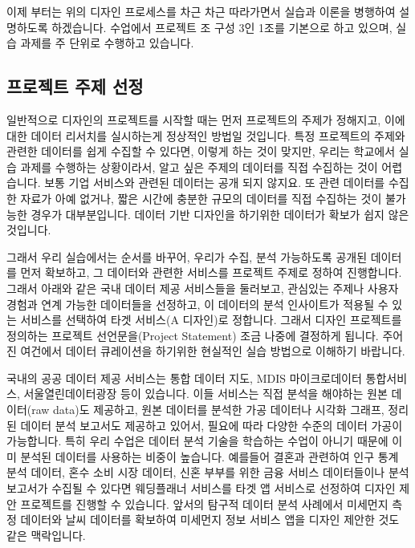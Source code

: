 \documentclass[
  letterpaper,
]{book}
\begin{document}
이제 부터는 위의 디자인 프로세스를 차근 차근 따라가면서 실습과 이론을
병행하여 설명하도록 하겠습니다. 수업에서 프로젝트 조 구성 3인 1조를
기본으로 하고 있으며, 실습 과제를 주 단위로 수행하고 있습니다.

\subsection{프로젝트 주제
선정}\label{uxd504uxb85cuxc81duxd2b8-uxc8fcuxc81c-uxc120uxc815-1}

일반적으로 디자인의 프로젝트를 시작할 때는 먼저 프로젝트의 주제가
정해지고, 이에 대한 데이터 리서치를 실시하는게 정상적인 방법일 것입니다.
특정 프로젝트의 주제와 관련한 데이터를 쉽게 수집할 수 있다면, 이렇게
하는 것이 맞지만, 우리는 학교에서 실습 과제를 수행하는 상황이라서, 알고
싶은 주제의 데이터를 직접 수집하는 것이 어렵습니다. 보통 기업 서비스와
관련된 데이터는 공개 되지 않지요. 또 관련 데이터를 수집한 자료가 아예
없거나, 짧은 시간에 충분한 규모의 데이터를 직접 수집하는 것이 불가능한
경우가 대부분입니다. 데이터 기반 디자인을 하기위한 데이터가 확보가 쉽지
않은 것입니다.

그래서 우리 실습에서는 순서를 바꾸어, 우리가 수집, 분석 가능하도록
공개된 데이터를 먼저 확보하고, 그 데이터와 관련한 서비스를 프로젝트
주제로 정하여 진행합니다. 그래서 아래와 같은 국내 데이터 제공 서비스들을
둘러보고, 관심있는 주제나 사용자 경험과 연계 가능한 데이터들을 선정하고,
이 데이터의 분석 인사이트가 적용될 수 있는 서비스를 선택하여 타겟
서비스(A 디자인)로 정합니다. 그래서 디자인 프로젝트를 정의하는 프로젝트
선언문을(Project Statement) 조금 나중에 결정하게 됩니다. 주어진 여건에서
데이터 큐레이션을 하기위한 현실적인 실습 방법으로 이해하기 바랍니다.

국내의 공공 데이터 제공 서비스는 통합 데이터 지도, MDIS 마이크로데이터
통합서비스, 서울열린데이터광장 등이 있습니다. 이들 서비스는 직접 분석을
해야하는 원본 데이터(raw data)도 제공하고, 원본 데이터를 분석한 가공
데이터나 시각화 그래프, 정리된 데이터 분석 보고서도 제공하고 있어서,
필요에 따라 다양한 수준의 데이터 가공이 가능합니다. 특히 우리 수업은
데이터 분석 기술을 학습하는 수업이 아니기 때문에 이미 분석된 데이터를
사용하는 비중이 높습니다. 예를들어 결혼과 관련하여 인구 통계 분석
데이터, 혼수 소비 시장 데이터, 신혼 부부를 위한 금융 서비스 데이터들이나
분석 보고서가 수집될 수 있다면 웨딩플래너 서비스를 타겟 앱 서비스로
선정하여 디자인 제안 프로젝트를 진행할 수 있습니다. 앞서의 탐구적 데이터
분석 사례에서 미세먼지 측정 데이터와 날씨 데이터를 확보하여 미세먼지
정보 서비스 앱을 디자인 제안한 것도 같은 맥락입니다.
\end{document}
